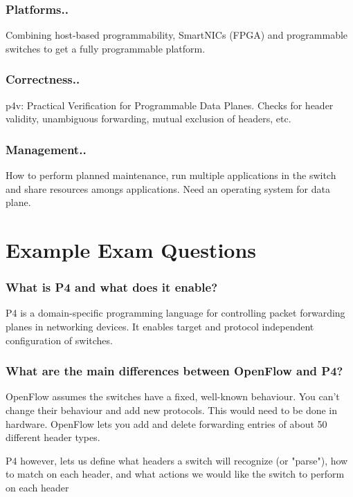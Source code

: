 \documentclass[a4paper, fontsize=8pt, landscape, DIV=1]{scrartcl}
\begin{document}
\begin{multicols*}{4}
  \subsubsection{Platforms..}
  Combining host-based programmability, SmartNICs (FPGA) and programmable switches
  to get a fully programmable platform.

  \subsubsection{Correctness..}
  p4v: Practical Verification for Programmable Data Planes. Checks for header validity, 
  unambiguous forwarding, mutual exclusion of headers, etc.

  \subsubsection{Management..}
  How to perform planned maintenance, run multiple applications in the switch and
  share resources amongs applications. Need an operating system for data plane. 


  \section{Example Exam Questions}
  \subsubsection{What is P4 and what does it enable?}
  P4 is a domain-specific programming language for controlling packet forwarding
  planes in networking devices. It enables target and protocol independent configuration
  of switches.

  \subsubsection{What are the main differences between OpenFlow and P4?}
  OpenFlow assumes the switches have a fixed, well-known behaviour. You can't change
  their behaviour and add new protocols. This would need to be done in hardware. OpenFlow
  lets you add and delete forwarding entries of about 50 different header types.

  P4 however, lets us define what headers a switch will recognize (or "parse"), 
  how to match on each header, and what actions we would like the switch to perform
  on each header


\end{multicols*}
\end{document}
